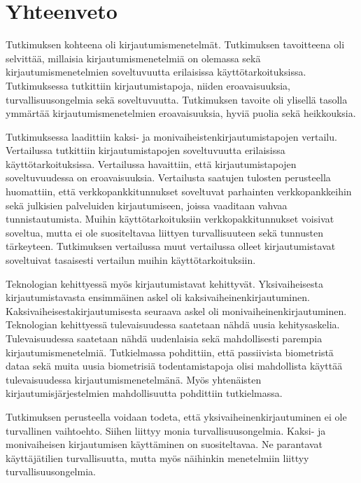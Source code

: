\chapter{Yhteenveto\label{yhteenveto}}

Tutkimuksen kohteena oli kirjautumismenetelmät. Tutkimuksen tavoitteena oli selvittää, millaisia kirjautumismenetelmiä on olemassa sekä kirjautumismenetelmien soveltuvuutta erilaisissa käyttötarkoituksissa. Tutkimuksessa tutkittiin kirjautumistapoja, niiden eroavaisuuksia, turvallisuusongelmia sekä soveltuvuutta. Tutkimuksen tavoite oli ylisellä tasolla ymmärtää kirjautumismenetelmien eroavaisuuksia, hyviä puolia sekä heikkouksia.

Tutkimuksessa laadittiin kaksi- ja monivaiheistenkirjautumistapojen vertailu. Vertailussa tutkittiin kirjautumistapojen soveltuvuutta erilaisissa käyttötarkoituksissa. Vertailussa havaittiin, että kirjautumistapojen soveltuvuudessa on eroavaisuuksia. Vertailusta saatujen tulosten perusteella huomattiin, että verkkopankkitunnukset soveltuvat parhainten verkkopankkeihin sekä julkisien palveluiden kirjautumiseen, joissa vaaditaan vahvaa tunnistautumista. Muihin käyttötarkoituksiin verkkopakkitunnukset voisivat soveltua, mutta ei ole suositeltavaa liittyen turvallisuuteen sekä tunnusten tärkeyteen. Tutkimuksen vertailussa muut vertailussa olleet kirjautumistavat soveltuivat tasaisesti vertailun muihin käyttötarkoituksiin.

Teknologian kehittyessä myös kirjautumistavat kehittyvät. Yksivaiheisesta kirjautumistavasta ensimmäinen askel oli kaksivaiheinenkirjautuminen. Kaksivaiheisestakirjautumisesta seuraava askel oli monivaiheinenkirjautuminen. Teknologian kehittyessä tulevaisuudessa saatetaan nähdä uusia kehitysaskelia. Tulevaisuudessa saatetaan nähdä uudenlaisia sekä mahdollisesti parempia kirjautumismenetelmiä. Tutkielmassa pohdittiin, että passiivista biometristä dataa sekä muita uusia biometrisiä todentamistapoja olisi mahdollista käyttää tulevaisuudessa kirjautumismenetelmänä. Myös yhtenäisten kirjautumisjärjestelmien mahdollisuutta pohdittiin tutkielmassa.

Tutkimuksen perusteella voidaan todeta, että yksivaiheinenkirjautuminen ei ole turvallinen vaihtoehto. Siihen liittyy monia turvallisuusongelmia. Kaksi- ja monivaiheisen kirjautumisen käyttäminen on suositeltavaa. Ne parantavat käyttäjätilien turvallisuutta, mutta myös näihinkin menetelmiin liittyy turvallisuusongelmia. 
